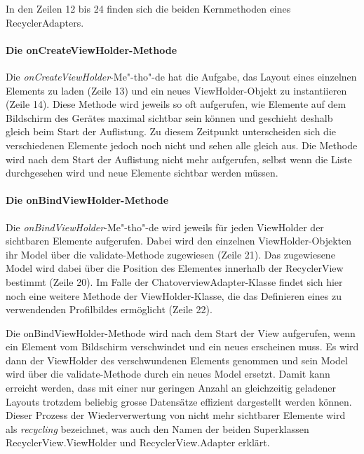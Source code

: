 \documentclass[../main.tex]{subfiles}
\begin{document}
	In den Zeilen 12 bis 24 finden sich die beiden Kernmethoden eines RecyclerAdapters.
	
	\paragraph{Die onCreateViewHolder-Methode}
	Die \emph{onCreateViewHolder}-Me"-tho"-de hat die Aufgabe, das Layout eines einzelnen Elements zu laden (Zeile 13) und ein neues ViewHolder-Objekt zu instantiieren (Zeile 14). Diese Methode wird jeweils so oft aufgerufen, wie Elemente auf dem Bildschirm des Gerätes maximal sichtbar sein können und geschieht deshalb gleich beim Start der Auflistung. Zu diesem Zeitpunkt unterscheiden sich die verschiedenen Elemente jedoch noch nicht und sehen alle gleich aus. Die Methode wird nach dem Start der Auflistung nicht mehr aufgerufen, selbst wenn die Liste durchgesehen wird und neue Elemente sichtbar werden müssen.
	
	\paragraph{Die onBindViewHolder-Methode}
	\sloppy
	Die \emph{onBindViewHolder}-Me"-tho"-de \newline wird jeweils für jeden ViewHolder der sichtbaren Elemente aufgerufen. Dabei wird den einzelnen ViewHolder-Objekten ihr Model über die validate-Methode zugewiesen (Zeile 21). Das zugewiesene Model wird dabei über die Position des Elementes innerhalb der RecyclerView bestimmt (Zeile 20). Im Falle der ChatoverviewAdapter-Klasse findet sich hier noch eine weitere Methode der ViewHolder-Klasse, die das Definieren eines zu verwendenden Profilbildes ermöglicht (Zeile 22).
	\fussy
	
	Die onBindViewHolder-Methode wird nach dem Start der View aufgerufen, wenn ein Element vom Bildschirm verschwindet und ein neues erscheinen muss. Es wird dann der ViewHolder des verschwundenen Elements genommen und sein Model wird über die validate-Methode durch ein neues Model ersetzt. Damit kann erreicht werden, dass mit einer nur geringen Anzahl an gleichzeitig geladener Layouts trotzdem beliebig grosse Datensätze effizient dargestellt werden können. Dieser Prozess der Wiederverwertung von nicht mehr sichtbarer Elemente wird als \emph{recycling} bezeichnet, was auch den Namen der beiden Superklassen RecyclerView.ViewHolder und RecyclerView.Adapter erklärt.
	
\end{document}
